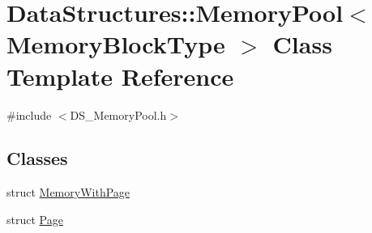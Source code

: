 \hypertarget{class_data_structures_1_1_memory_pool}{\section{Data\-Structures\-:\-:Memory\-Pool$<$ Memory\-Block\-Type $>$ Class Template Reference}
\label{class_data_structures_1_1_memory_pool}
}


{\ttfamily \#include $<$D\-S\-\_\-\-Memory\-Pool.\-h$>$}

\subsection*{Classes}
\begin{DoxyCompactItemize}
\item 
struct \hyperlink{struct_data_structures_1_1_memory_pool_1_1_memory_with_page}{Memory\-With\-Page}
\item 
struct \hyperlink{struct_data_structures_1_1_memory_pool_1_1_page}{Page}
\end{DoxyCompactItemize}
